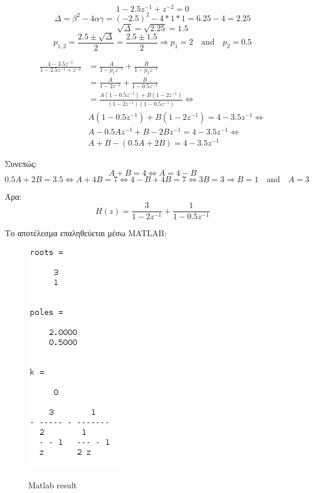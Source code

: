 \documentclass[11pt]{article}
\begin{document}
\[ 1 - 2.5z^{-1} + z^{-2} = 0 \]
\[ Δ = β^2-4αγ = (-2.5)^2-4*1*1 = 6.25 - 4 = 2.25 \]
\[ \sqrt{Δ} = \sqrt{2.25} = 1.5 \]
\[ p_{1,2} = \frac{2.5 \pm \sqrt{Δ}}{2} = \frac{2.5\pm1.5}{2} \Rightarrow p_1=2 \quad \textrm{and} \quad p_2=0.5 \]


\begin{align*}
    \frac{4-3.5z^{-1}}{1-2.5z^{-1}+z^{-2}} &= \frac{A}{1-p_{1}z^{-1}} + \frac{B}{1-p_{2}z^{-1}} \\
    &=\frac{A}{1-2z^{-1}} + \frac{B}{1-0.5z^{-1}} \\
    &=\frac{A(1-0.5z^{-1}) + B(1-2z^{-1})}{(1-2z^{-1})(1-0.5z^{-1})} \Leftrightarrow \\
    & A(1-0.5z^{-1}) + B(1-2z^{-1})=4-3.5z^{-1} \Leftrightarrow \\
    & A - 0.5Az^{-1} + B -2Bz^{-1} = 4 -3.5z^{-1} \Leftrightarrow \\
    & A + B - (0.5A + 2B) = 4 -3.5z^{-1}
\end{align*}

\par \noindent
Συνεπώς:
\[ A+B=4 \Leftrightarrow A=4-B \]
\[ 0.5A+2B=3.5 \Leftrightarrow  A+4B=7 \Leftrightarrow  4-B+4B=7 \Leftrightarrow  3B=3 \Rightarrow  B=1 \quad \textrm{and} \quad  A=3 \]

\par \noindent
Άρα:
$$H(z) =\frac{3}{1-2z^{-1}} + \frac{1}{1-0.5z^{-1}} $$ 

\par \noindent
Το αποτέλεσμα επαληθεύεται μέσω MATLAB:

\begin{figure}[H]
    \centering
   \includegraphics[scale=0.6]{photos/roots_poles_k.png} \\
    \caption{Matlab result}
\end{figure}
\end{document}

